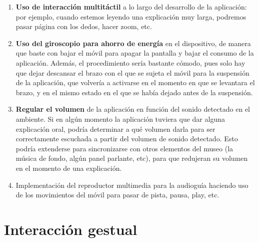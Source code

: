 \documentclass{article}
\begin{document}
\begin{enumerate}
	\item \textbf{Uso de interacción multitáctil} a lo largo del desarrollo de la aplicación: por ejemplo, cuando estemos leyendo una explicación muy larga, podremos pasar página con los dedos, hacer zoom, etc.

	\item \textbf{Uso del giroscopio para ahorro de energía} en el dispositivo, de manera que baste con bajar el móvil para apagar la pantalla y bajar el consumo de la aplicación. Además, el procedimiento sería bastante cómodo, pues solo hay que dejar descansar el brazo con el que se sujeta el móvil para la suspensión de la aplicación, que volvería a activarse en el momento en que se levantara el brazo, y en el mismo estado en el que se había dejado antes de la suspensión.

	\item \textbf{Regular el volumen} de la aplicación en función del sonido detectado en el ambiente. Si en algún momento la aplicación tuviera que dar alguna explicación oral, podría determinar a qué volumen darla para ser correctamente escuchada a partir del volumen de sonido detectado. Esto podría extenderse para sincronizarse con otros elementos del museo (la música de fondo, algún panel parlante, etc), para que redujeran su volumen en el momento de una explicación.	
	
	\item Implementación del reproductor multimedia para la audioguía haciendo uso de los movimientos del móvil para pasar de pista, pausa, play, etc.
\end{enumerate}

\section{Interacción gestual}
\end{document}
